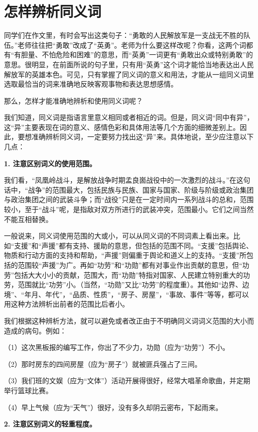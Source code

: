 
\section{怎样辨析同义词}

同学们在作文里，有时会写出这类句子：“勇敢的人民解放军是一支战无不胜的队伍。”老师往往把“勇敢”改成了“英勇”。老师为什么要这样改呢？你看，这两个词都有“有胆量、不怕危险和困难”的意思，而“英勇”一词更有“勇敢出众或特别勇敢”的意思。很明显，在前面所说的句子里，只有用“英勇”这个词才能恰当地表达出人民解放军的英雄本色。可见，只有掌握了同义词的意义和用法，才能从一组同义词里选取最恰当的词来准确地反映客观事物和表达思想感情。

那么，怎样才能准确地辨析和使用同义词呢？

我们知道，同义词是指语言里意义相同或者相近的词。但是，同义词“同中有异”，这“异”主要表现在词的意义、感情色彩和具体用法等几个方面的细微差别上。因此，要想准确辨析同义词，一定要努力找出这“异”来。具体地说，至少应注意以下几点：

\textbf{1. 注意区别词义的使用范围。}

我们看，“凤凰岭战斗，是解放战争时期孟良崮战役中的一次激烈的战斗。”在这句话中，“战争”的范围最大，包括民族与民族、国家与国家、阶级与阶级或政治集团与政治集团之间的武装斗争；而“战役”只是在一定时间内一系列战斗的总和，范围较小，至于“战斗”呢，是指敌对双方所进行的武装冲突，范围最小。它们之间当然不能互相替换。

一般说来，同义词使用范围的大或小，可以从同义词的不同词素上看出来。比如“支援”和“声援”都有支持、援助的意思，但包括的范围不同。“支援”包括舆论、物质和行动方面的支持和帮助，“声援”则偏重于舆论和道义上的支持。“支援”所包括的范围较“声援”为广。再如“功劳”和“功勋”都有对事业作出贡献的意思，但“功劳”包括大大小小的贡献，范围大，而“功勋”特指对国家、人民建立特别重大的功劳，范围就比“功劳”小。（当然，“功勋”又比“功劳”的程度重）。其他如“边界、边境”、“年月、年代”，“品质、性质”，“房子、房屋”，“事故、事件”等等，都可以用这种方法辨析出前者的范围比后者小。

我们根据这种辨析方法，就可以避免或者改正由于不明确同义词词义范围的大小而造成的病句。例如：

（1）这次黑板报的编写工作，你出了不少力，功勋（应为“功劳”）不小。

（2）那时房东的四间房屋（应为“房子”）就被匪兵强占了三间。

（3）我们班的文娱（应为“文体”）活动开展得很好，经常大唱革命歌曲，并定期举行篮球比赛。

（4）早上气候（应为“天气”）很好，没有多久却阴云密布，下起雨来。

\textbf{2. 注意区别词义的轻重程度。}

